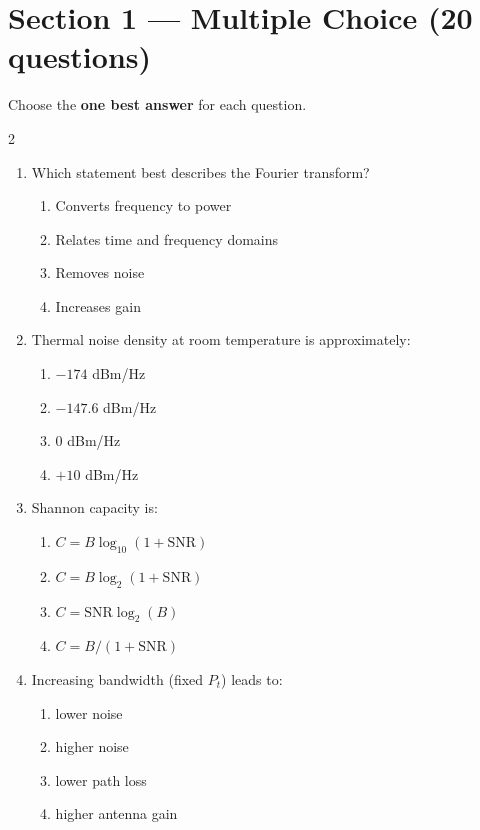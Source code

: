 \section*{Section 1 --- Multiple Choice (20 questions)}

Choose the \textbf{one best answer} for each question.

\vspace{0.3cm}

\begin{multicols}{2}
\begin{enumerate}[leftmargin=*, itemsep=0.4em]

\item Which statement best describes the Fourier transform?
\begin{enumerate}[label=\alph*)]
\item Converts frequency to power
\item Relates time and frequency domains
\item Removes noise
\item Increases gain
\end{enumerate}

\item Thermal noise density at room temperature is approximately:
\begin{enumerate}[label=\alph*)]
\item $-174$ dBm/Hz
\item $-147.6$ dBm/Hz
\item $0$ dBm/Hz
\item $+10$ dBm/Hz
\end{enumerate}

\item Shannon capacity is:
\begin{enumerate}[label=\alph*)]
\item $C = B\log_{10}(1+\mathrm{SNR})$
\item $C = B\log_2(1+\mathrm{SNR})$
\item $C = \mathrm{SNR}\log_2(B)$
\item $C = B/(1+\mathrm{SNR})$
\end{enumerate}

\item Increasing bandwidth (fixed $P_t$) leads to:
\begin{enumerate}[label=\alph*)]
\item lower noise
\item higher noise
\item lower path loss
\item higher antenna gain
\end{enumerate}


\end{enumerate}
\end{multicols}

